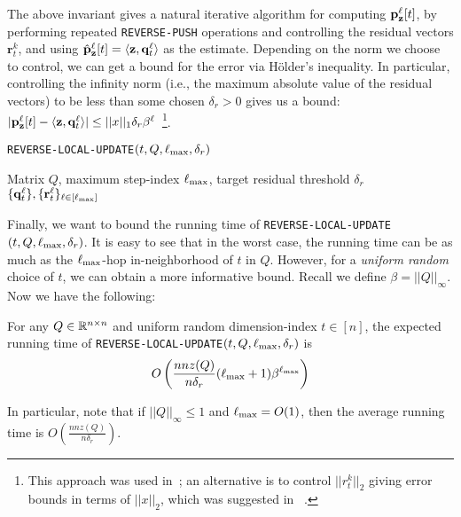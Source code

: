 The above invariant gives a natural iterative algorithm for computing ${\mathbf{p}}_\mathbf{z}^{\ell}[t]$, by performing repeated \texttt{REVERSE-PUSH} operations and controlling the residual vectors $\mathbf{r}_t^k$, and using $\hat{\mathbf{p}}_\mathbf{z}^{\ell}[t] = \langle\mathbf{z},\mathbf{q}_t^{\ell}\rangle$ as the estimate. 
Depending on the norm we choose to control, we can get a bound for the error via H{\"o}lder's inequality.
In particular, controlling the infinity norm (i.e., the maximum absolute value of the residual vectors) to be less than some chosen $\delta_r>0$ gives us a bound: $|{\mathbf{p}}_\mathbf{z}^{\ell}[t] - \langle\mathbf{z},\mathbf{q}_t^{\ell}\rangle|\leq ||x||_1\delta_r\beta^{\ell}$~\footnote{This approach was used in~\cite{andersen2007local,Lofgren2014,banerjee2015fast}; an alternative is to control $||r_t^k||_2$ giving error bounds in terms of $||x||_2$, which was suggested in ~\cite{lee2014asynchronous}.}.

\begin{algorithm}[ht]
\caption{\texttt{REVERSE-LOCAL-UPDATE}$(t,Q, \ell_{\max}, \delta_r)$}
\label{alg:rwork}
\begin{algorithmic}[1]
\REQUIRE Matrix $Q$, maximum step-index $\ell_{\max}$, target residual threshold $\delta_r$
\ENDWHILE
\ENDFOR
\RETURN $\{\mathbf{q}^{\ell}_t\}, \{\mathbf{r}^{\ell}_t\}_{\ell\in[\ell_{\max}]}$
\end{algorithmic}
\end{algorithm}    

Finally, we want to bound the running time of \texttt{REVERSE-LOCAL-UPDATE}$(t,Q,\ell_{\max},\delta_r)$. 
It is easy to see that in the worst case, the running time can be as much as the $\ell_{\max}$-hop in-neighborhood of $t$ in $Q$. 
However, for a \emph{uniform random} choice of $t$, we can obtain a more informative bound. 
Recall we define $\beta = ||Q||_{\infty}$. Now we have the following:

\begin{lemma}
\label{lem:pushinvariant}
For any $Q\in\mathbb{R}^{n\times n}$ and uniform random dimension-index $t\in[n]$, the expected running time of \texttt{REVERSE-LOCAL-UPDATE}$(t,Q,\ell_{\max},\delta_r)$ is 
$$O\left(\frac{nnz(Q)}{n\delta_r}(\ell_{\max}+1)\beta^{\ell_{\max}}\right)$$ 
\end{lemma}

In particular, note that if $||Q||_{\infty}\leq 1$ and $\ell_{\max}=O(1)$, then the average running time is $O\left(\frac{nnz(Q)}{n\delta_r}\right)$.

